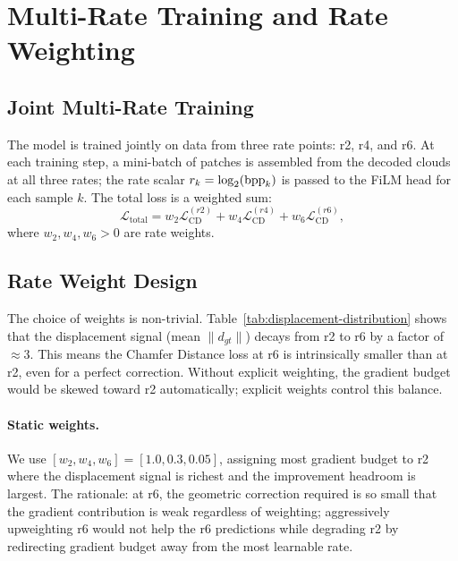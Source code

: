\section{Multi-Rate Training and Rate Weighting}
\label{sec:multi-rate}

\subsection{Joint Multi-Rate Training}

The model is trained jointly on data from three rate points: r2, r4, and r6.
At each training step, a mini-batch of patches is assembled from the decoded
clouds at all three rates; the rate scalar $r_k = \log_2(\mathrm{bpp}_k)$ is passed
to the FiLM head for each sample $k$.
The total loss is a weighted sum:
\begin{equation}
  \mathcal{L}_{\text{total}} =
    w_2 \mathcal{L}_{\text{CD}}^{(r2)}
    + w_4 \mathcal{L}_{\text{CD}}^{(r4)}
    + w_6 \mathcal{L}_{\text{CD}}^{(r6)},
\end{equation}
where $w_2, w_4, w_6 > 0$ are rate weights.

\subsection{Rate Weight Design}

The choice of weights is non-trivial.
Table~\ref{tab:displacement-distribution} shows that the displacement signal
(mean $\|d_{gt}\|$) decays from r2 to r6 by a factor of $\approx 3$.
This means the Chamfer Distance loss at r6 is intrinsically smaller than at r2,
even for a perfect correction.
Without explicit weighting, the gradient budget would be skewed toward r2
automatically; explicit weights control this balance.

\paragraph{Static weights.}
We use $[w_2, w_4, w_6] = [1.0, 0.3, 0.05]$, assigning most gradient budget
to r2 where the displacement signal is richest and the improvement headroom
is largest.
The rationale: at r6, the geometric correction required is so small that the
gradient contribution is weak regardless of weighting; aggressively upweighting
r6 would not help the r6 predictions while degrading r2 by redirecting gradient
budget away from the most learnable rate.

